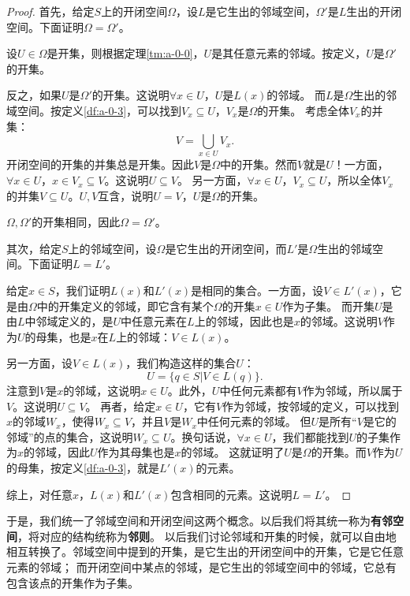 \documentclass[12pt,UTF8,fontset=none]{ctexbook}
\begin{document}
\begin{appendix}
\begin{proof}
    首先，给定$S$上的开闭空间$\Omega$，设$L$是它生出的邻域空间，$\Omega'$是$L$生出的开闭空间。下面证明$\Omega = \Omega'$。
    
    设$U\in\Omega$是开集，则根据定理\ref{tm:a-0-0}，$U$是其任意元素的邻域。按定义，$U$是$\Omega'$的开集。

    反之，如果$U$是$\Omega'$的开集。这说明$\forall x \in U$，$U$是$L(x)$的邻域。
    而$L$是$\Omega$生出的邻域空间。按定义\ref{df:a-0-3}，可以找到$V_x\subseteq U$，$V_x$是$\Omega$的开集。
    考虑全体$V_x$的并集：
    $$V = \bigcup_{x\in U} V_x. $$
    开闭空间的开集的并集总是开集。因此$V$是$\Omega$中的开集。然而$V$就是$U$！一方面，$\forall x\in U$，$x\in V_x \subseteq V$。这说明$U\subseteq V$。
    另一方面，$\forall x\in U$，$V_x\subseteq U$，所以全体$V_x$的并集$V\subseteq U$。$U, V$互含，说明$U = V$，$U$是$\Omega$的开集。

    $\Omega,\Omega'$的开集相同，因此$\Omega = \Omega'$。

    其次，给定$S$上的邻域空间，设$\Omega$是它生出的开闭空间，而$L'$是$\Omega$生出的邻域空间。下面证明$L=L'$。

    给定$x\in S$，我们证明$L(x)$和$L'(x)$是相同的集合。一方面，设$V\in L'(x)$，它是由$\Omega$中的开集定义的邻域，即它含有某个$\Omega$的开集$x\in U$作为子集。
    而开集$U$是由$L$中邻域定义的，是$U$中任意元素在$L$上的邻域，因此也是$x$的邻域。这说明$V$作为$U$的母集，也是$x$在$L$上的邻域：$V\in L(x)$。

    另一方面，设$V\in L(x)$，我们构造这样的集合$U$：
    $$ U = \{q \in S | V \in L(q)\}. $$
    注意到$V$是$x$的邻域，这说明$x\in U$。此外，$U$中任何元素都有$V$作为邻域，所以属于$V$。这说明$U\subseteq V$。
    再者，给定$x\in U$，它有$V$作为邻域，按邻域的定义，可以找到$x$的邻域$W_x$，使得$W_x \subseteq V$，并且$V$是$W_x$中任何元素的邻域。
    但$U$是所有“$V$是它的邻域”的点的集合，这说明$W_x\subseteq U$。换句话说，$\forall x\in U$，我们都能找到$U$的子集作为$x$的邻域，因此$U$作为其母集也是$x$的邻域。
    这就证明了$U$是$\Omega$的开集。而$V$作为$U$的母集，按定义\ref{df:a-0-3}，就是$L'(x)$的元素。

    综上，对任意$x$，$L(x)$和$L'(x)$包含相同的元素。这说明$L=L'$。    
\end{proof}

于是，我们统一了邻域空间和开闭空间这两个概念。以后我们将其统一称为\textbf{有邻空间}，将对应的结构统称为\textbf{邻则}。
以后我们讨论邻域和开集的时候，就可以自由地相互转换了。邻域空间中提到的开集，是它生出的开闭空间中的开集，它是它任意元素的邻域；
而开闭空间中某点的邻域，是它生出的邻域空间中的邻域，它总有包含该点的开集作为子集。


\end{appendix}
\end{document}
